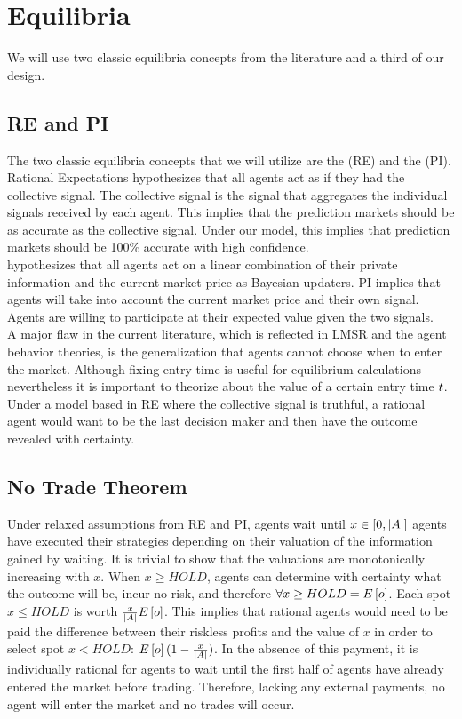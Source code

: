 \section{Equilibria}
We will use two classic equilibria concepts from the literature and a third of our design. 

\subsection{RE and PI}
The two classic equilibria concepts that we will utilize are the  (RE) and the  (PI). Rational Expectations hypothesizes that all agents act as if they had the collective signal. The collective signal is the signal that aggregates the individual signals received by each agent. This implies that the prediction markets should be as accurate as the collective signal. Under our model, this implies that prediction markets should be 100\% accurate with high confidence.\\

 hypothesizes that all agents act on a linear combination of their private information and the current market price as Bayesian updaters. PI implies that agents will take into account the current market price and their own signal. Agents are willing to participate at their expected value given the two signals. \\

A major flaw in the current literature, which is reflected in LMSR and the agent behavior theories, is the generalization that agents cannot choose when to enter the market. Although fixing entry time is useful for equilibrium calculations nevertheless it is important to theorize about the value of a certain entry time $t$. Under a model based in RE where the collective signal is truthful, a rational agent would want to be the last decision maker and then have the outcome revealed with certainty.\\

\subsection{No Trade Theorem}
Under relaxed assumptions from RE and PI, agents wait until $x \in \left[0, |A| \right]$ agents have executed
their strategies depending on their valuation of the information gained by waiting. It is trivial to show that 
the valuations are monotonically increasing with $x$. When $x \geq HOLD$, agents can 
determine with certainty what the outcome will be, incur no risk, and therefore $\forall x \geq HOLD = E\left[o\right]$.
Each spot  $x \leq HOLD$ is worth $\frac{x}{|A|} 
E\left[o\right]$. This implies that rational agents
would need to be paid the difference between their riskless profits and the value of $x$ in order to select spot $x < HOLD$: $E\left[o\right](1 - \frac{x}{|A|})$. In the absence of this payment, it is individually rational for agents to wait until the first half of agents have already entered the market before trading. Therefore, lacking any external payments, no agent will enter the market and no
trades will occur.

